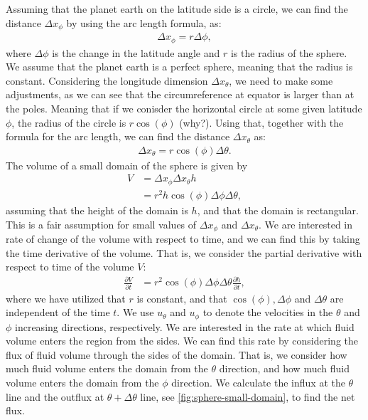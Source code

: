 Assuming that the planet earth on the latitude side is a circle, we can find the distance $\Delta x_{\phi}$ by using the arc length formula, as:
\begin{align*}
    \Delta x_{\phi} = r \Delta \phi,
\end{align*}
where $\Delta \phi$ is the change in the latitude angle and $r$ is the radius of the sphere.
We assume that the planet earth is a perfect sphere, meaning that the radius is constant.
Considering the longitude dimension $\Delta x_{\theta}$, we need to make some adjustments, as we can see that the circumreference at equator is larger than at the poles.
Meaning that if we conisder the horizontal circle at some given latitude $\phi$, the radius of the circle is $r \cos(\phi)$ (why?).
Using that, together with the formula for the arc length, we can find the distance $\Delta x_{\theta}$ as:
\begin{align*}
    \Delta x_{\theta} = r \cos(\phi) \Delta \theta.
\end{align*}
The volume of a small domain of the sphere is given by 
\begin{align*}
    V &= \Delta x_{\phi} \Delta x_{\theta} h \\
    &= r^2 h \cos(\phi) \Delta \phi \Delta \theta,
\end{align*}
assuming that the height of the domain is $h$, and that the domain is rectangular.
This is a fair assumption for small values of $\Delta x_{\phi}$ and $\Delta x_{\theta}$.
We are interested in rate of change of the volume with respect to time, and we can find this by taking the time derivative of the volume.
That is, we consider the partial derivative with respect to time of the volume $V$:
\begin{align}\label{eq:sphere-volume-time-derivative}
    \frac{\partial V}{\partial t} &= r^2 \cos(\phi) \Delta \phi \Delta \theta \frac{\partial h}{\partial t},
\end{align}
where we have utilized that $r$ is constant, and that $\cos(\phi), \Delta \phi$ and $\Delta \theta$ are independent of the time $t$.
We use $u_{\theta}$ and $u_{\phi}$ to denote the velocities in the $\theta$ and $\phi$ increasing directions, respectively.
We are interested in the rate at which fluid volume enters the region from the sides.
We can find this rate by considering the flux of fluid volume through the sides of the domain.
That is, we consider how much fluid volume enters the domain from the $\theta$ direction, and how much fluid volume enters the domain from the $\phi$ direction.
We calculate the influx at the $\theta$ line and the outflux at $\theta + \Delta \theta$ line, see \autoref{fig:sphere-small-domain}, to find the net flux.
